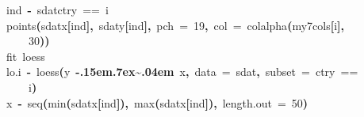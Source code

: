 \documentclass[a4paper]{article}
\newcommand{\hlnumber}[1]{\textcolor[rgb]{0.0823529411764706,0.0784313725490196,0.709803921568627}{#1}}%
\newcommand{\hlfunctioncall}[1]{\textcolor[rgb]{1,0,0}{#1}}%
\newcommand{\hlkeyword}[1]{\textcolor[rgb]{0,0,0}{\textbf{#1}}}%
\newcommand{\hlargument}[1]{\textcolor[rgb]{0.694117647058824,0.247058823529412,0.0196078431372549}{#1}}%
\newcommand{\hlcomment}[1]{\textcolor[rgb]{0.8,0.8,0.8}{#1}}%
\newcommand{\hlassignement}[1]{\textcolor[rgb]{0.215686274509804,0.215686274509804,0.384313725490196}{\textbf{#1}}}%
\newcommand{\hlsymbol}[1]{\textcolor[rgb]{0,0,0}{#1}}%
\newcommand{\hlprompt}[1]{\textcolor[rgb]{0,0,0}{#1}}%
\def\urltilda{\kern -.15em\lower .7ex\hbox{\~{}}\kern .04em}%
\newcommand{\hlstd}[1]{\textcolor[rgb]{0,0,0}{#1}}%
\newenvironment{Houtput}{\raggedright}{%
%
}
\begin{document}
\begin{Houtput}
\hlstd{}\hlprompt{{\ }}{\ }{\ }{\ }{\ }\hlsymbol{ind}{\ }\hlassignement{\usebox{\hlnormalsizeboxlessthan}-}{\ }\hlsymbol{sdat}\hlkeyword{\usebox{\hlnormalsizeboxdollar}}\hlsymbol{ctry}{\ }=={\ }\hlsymbol{i}\hspace*{\fill}\\
\hlstd{}\hlprompt{{\ }}{\ }{\ }{\ }{\ }\hlfunctioncall{points}\hlkeyword{(}\hlsymbol{sdat}\hlkeyword{\usebox{\hlnormalsizeboxdollar}}\hlsymbol{x}\hlkeyword{[}\hlsymbol{ind}\hlkeyword{]}\hlkeyword{,}{\ }\hlsymbol{sdat}\hlkeyword{\usebox{\hlnormalsizeboxdollar}}\hlsymbol{y}\hlkeyword{[}\hlsymbol{ind}\hlkeyword{]}\hlkeyword{,}{\ }\hlargument{pch}{\ }\hlargument{=}{\ }\hlnumber{19}\hlkeyword{,}{\ }\hlargument{col}{\ }\hlargument{=}{\ }\hlfunctioncall{colalpha}\hlkeyword{(}\hlsymbol{my7cols}\hlkeyword{[}\hlsymbol{i}\hlkeyword{]}\hlkeyword{,}\hspace*{\fill}\\
\hlstd{}\hlprompt{{\ }}{\ }{\ }{\ }{\ }{\ }{\ }{\ }{\ }\hlnumber{30}\hlkeyword{)}\hlkeyword{)}\hspace*{\fill}\\
\hlstd{}\hlprompt{{\ }}{\ }{\ }{\ }{\ }\hlcomment{\usebox{\hlnormalsizeboxhash}{\ }fit{\ }loess}\hspace*{\fill}\\
\hlstd{}\hlprompt{{\ }}{\ }{\ }{\ }{\ }\hlsymbol{lo.i}{\ }\hlassignement{\usebox{\hlnormalsizeboxlessthan}-}{\ }\hlfunctioncall{loess}\hlkeyword{(}\hlsymbol{y}{\ }\hlkeyword{\urltilda{}}{\ }\hlsymbol{x}\hlkeyword{,}{\ }\hlargument{data}{\ }\hlargument{=}{\ }\hlsymbol{sdat}\hlkeyword{,}{\ }\hlargument{subset}{\ }\hlargument{=}{\ }\hlsymbol{ctry}{\ }==\hspace*{\fill}\\
\hlstd{}\hlprompt{{\ }}{\ }{\ }{\ }{\ }{\ }{\ }{\ }{\ }\hlsymbol{i}\hlkeyword{)}\hspace*{\fill}\\
\hlstd{}\hlprompt{{\ }}{\ }{\ }{\ }{\ }\hlsymbol{x}{\ }\hlassignement{\usebox{\hlnormalsizeboxlessthan}-}{\ }\hlfunctioncall{seq}\hlkeyword{(}\hlfunctioncall{min}\hlkeyword{(}\hlsymbol{sdat}\hlkeyword{\usebox{\hlnormalsizeboxdollar}}\hlsymbol{x}\hlkeyword{[}\hlsymbol{ind}\hlkeyword{]}\hlkeyword{)}\hlkeyword{,}{\ }\hlfunctioncall{max}\hlkeyword{(}\hlsymbol{sdat}\hlkeyword{\usebox{\hlnormalsizeboxdollar}}\hlsymbol{x}\hlkeyword{[}\hlsymbol{ind}\hlkeyword{]}\hlkeyword{)}\hlkeyword{,}{\ }\hlargument{length.out}{\ }\hlargument{=}{\ }\hlnumber{50}\hlkeyword{)}\hspace*{\fill}\\

\end{Houtput}
\end{document}

